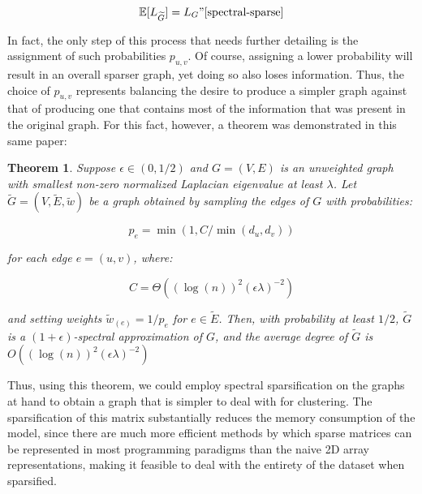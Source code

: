 \documentclass{article}
\newtheorem{theorem}{Theorem}[section]
\begin{document}
$$ \mathbb{E}[L_{\widetilde{G}}] = L_{G}" \cite{spectral-sparse} $$

In fact, the only step of this process that needs further detailing is the assignment of such probabilities $p_{u,v}$. Of course, assigning a lower probability will result in an overall sparser graph, yet doing so also loses information. Thus, the choice of $p_{u,v}$ represents balancing the desire to produce a simpler graph against that of producing one that contains most of the information that was present in the original graph. For this fact, however, a theorem was demonstrated in this same paper:

\begin{theorem}
Suppose $\epsilon\in(0,1/2)$ and $G = (V, E)$ is an unweighted graph with smallest non-zero normalized Laplacian eigenvalue at least $\lambda$. Let $\widetilde{G} = (V, \widetilde{E}, \widetilde{w})$ be a graph obtained by sampling the edges of $G$ with probabilities:

$$ p_e = \min (1,C/\min(d_u, d_v)) $$

for each edge $e = (u,v )$, where: 

$$ C = \Theta ((\log(n))^2 (\epsilon\lambda)^{-2} ) $$

and setting weights $\widetilde{w}_{(e)} = 1/p_e$  for $e\in\widetilde{E}$. Then, with probability at least $1/2$, $\widetilde{G}$ is a $(1 + \epsilon)$-spectral approximation of $G$, and the average degree of $\widetilde{G}$ is $O((\log(n))^2 (\epsilon\lambda)^{-2} )$ \cite{spectral-sparse}
\end{theorem}

Thus, using this theorem, we could employ spectral sparsification on the graphs at hand to obtain a graph that is simpler to deal with for clustering. The sparsification of this matrix substantially reduces the memory consumption of the model, since there are much more efficient methods by which sparse matrices can be represented in most programming paradigms than the naive 2D array representations, making it feasible to deal with the entirety of the dataset when sparsified.
\end{document}
